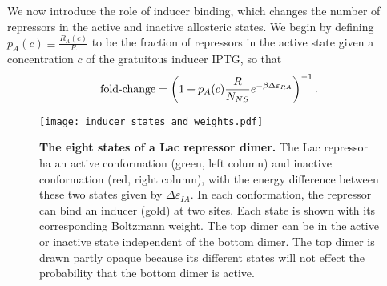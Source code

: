 We now introduce the role of inducer binding, which changes the number of
repressors in the active and inactive allosteric states. We begin by defining
$p_A(c) \equiv \frac{R_A(c)}{R}$ to be the fraction of repressors in the
active state given a concentration $c$ of the gratuitous inducer IPTG, so that
\begin{equation}
\operatorname{fold-change} = \left( 1+p_A(c) \frac{R}{N_{NS}}e^{-\beta
	\Delta\varepsilon_{RA}} \right)^{-1}. \label{eq5}
\end{equation}


\begin{figure}[h]
	\centering \texttt{[image: inducer\_states\_and\_weights.pdf]}
	\caption{{\bf The eight states of a Lac repressor dimer.} The Lac repressor ha\globalScalePlotss
		an active conformation (green, left column) and inactive conformation (red,
		right column), with the energy difference between these two states given by
		$\Delta \varepsilon_{IA}$. In each conformation, the repressor can bind an inducer (gold) at
		two sites. Each state is shown with its corresponding Boltzmann weight. The top
		dimer can be in the active or inactive state independent of the bottom dimer.
		The top dimer is drawn partly opaque because its different states will not
		effect the probability that the bottom dimer is active. %
	} \label{figrepressorInducerStates}
\end{figure}

